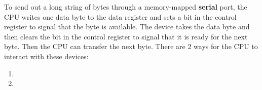 To send out a long string of bytes through a memory-mapped \textbf{serial} port, the CPU writes one data byte to the data register and sets a bit in the control register to signal that the byte is available.
The device takes the data byte and then clears the bit in the control register to signal that it is ready for the next byte.
Then the CPU can transfer the next byte.
There are 2 ways for the CPU to interact with these devices:
\begin{enumerate}[noitemsep]
\item {}
\item {}
\end{enumerate}


